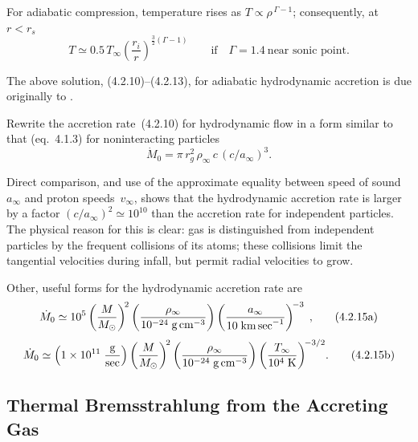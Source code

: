 For adiabatic compression, temperature rises as
$T \propto \rho^{\,\Gamma-1}$; consequently, at $r < r_s$
%
\begin{equation}
T \simeq 0.5\,T_\infty\left(\frac{r_i}{r}\right)^{\frac{3}{2}(\Gamma-1)}
\qquad \text{if} \quad \Gamma = 1.4~\text{near sonic point.}
\tag{4.2.13c}
\end{equation}

The above solution, (4.2.10)--(4.2.13), for adiabatic hydrodynamic accretion
is due originally to \citet{Bondi1952}.

Rewrite the accretion rate~(4.2.10) for hydrodynamic flow in a form similar
to that (eq.~4.1.3) for noninteracting particles
%
\begin{equation}
\dot{M}_0 = \pi\,r_g^2\,\rho_\infty\,c\,(c/a_\infty)^3.
\tag{4.2.14}
\end{equation}

Direct comparison, and use of the approximate equality between speed of sound
$a_\infty$ and proton speeds~$v_\infty$, shows that the hydrodynamic
accretion rate is larger by a factor $(c/a_\infty)^2 \simeq 10^{10}$ than
the accretion rate for independent particles.  The physical reason for this
is clear: gas is distinguished from independent particles by the frequent
collisions of its atoms; these collisions limit the tangential velocities
during infall, but permit radial velocities to grow.

Other, useful forms for the hydrodynamic accretion rate are
%
\begin{equation}
\dot{M}_0 \simeq 10^{5}
\left(\frac{M}{M_\odot}\right)^{\!2}
\left(\frac{\rho_\infty}{10^{-24}\;\text{g\,cm}^{-3}}\right)
\left(\frac{a_\infty}{10\;\text{km\,sec}^{-1}}\right)^{\!-3}
\;\text{,}
\tag{4.2.15a}
\end{equation}
%
\begin{equation}
\dot{M}_0 \simeq \left(1\times 10^{11}\;\frac{\text{g}}{\text{sec}}\right)
\left(\frac{M}{M_\odot}\right)^{\!2}
\left(\frac{\rho_\infty}{10^{-24}\;\text{g\,cm}^{-3}}\right)
\left(\frac{T_\infty}{10^4\;\text{K}}\right)^{\!-3/2}\!.
\tag{4.2.15b}
\end{equation}


\subsection{Thermal Bremsstrahlung from the Accreting Gas}
\label{sec:4.3}


